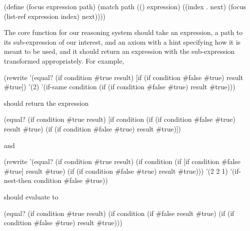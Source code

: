 \begin{Snippet}
  (define (focus expression path)
    (match path
      (()
       expression)
      ((index . next)
       (focus (list-ref expression index) next))))
\end{Snippet}

The core function for our reasoning system should take an expression,
a path to its sub-expression of our interest, and an axiom with a hint
specifying how it is meant to be used, and it should return an expression
with the sub-expression transformed appropriately. For example,

\begin{Snippet}
  (rewrite '(equal? (if condition #true result)
                    [if (if condition #false #true)
                        result
                        #true])
           '(2)
           '(if-same condition
                     (if (if condition #false #true)
                         result
                         #true)))
\end{Snippet}

should return the expression

\begin{Snippet}
  (equal? (if condition #true result)
          [if condition
              (if (if condition #false #true)
                  result
                  #true)
              (if (if condition #false #true)
                  result
                  #true)])
\end{Snippet}

and

\begin{Snippet}
  (rewrite '(equal? (if condition #true result)
                    (if condition
                       (if [if condition #false #true]
                           result
                           #true)
                       (if (if condition #false #true)
                           result
                           #true)))
           '(2 2 1)
           '(if-nest-then condition #false #true))
\end{Snippet}

should evaluate to

\begin{Snippet}
  (equal? (if condition #true result)
          (if condition
              (if #false
                  result
                  #true)
             (if (if condition #false #true)
                  result
                  #true)))
\end{Snippet}

